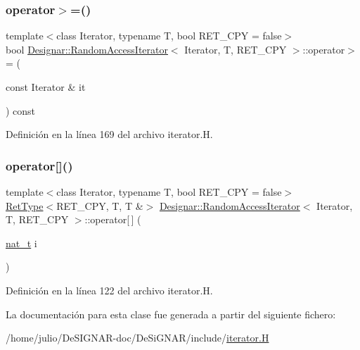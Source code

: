 \subsubsection{\texorpdfstring{operator$>$=()}{operator>=()}}
{\footnotesize\ttfamily template$<$class Iterator, typename T, bool R\+E\+T\+\_\+\+C\+PY = false$>$ \\
bool \hyperlink{class_designar_1_1_random_access_iterator}{Designar\+::\+Random\+Access\+Iterator}$<$ Iterator, T, R\+E\+T\+\_\+\+C\+PY $>$\+::operator$>$= (\begin{DoxyParamCaption}\item[{const Iterator \&}]{it }\end{DoxyParamCaption}) const\hspace{0.3cm}{\ttfamily [inline]}}



Definición en la línea 169 del archivo iterator.\+H.

\mbox{\label{class_designar_1_1_random_access_iterator_a19e24a37b546cb41aed275ff61fbc0b7}} 
\subsubsection{\texorpdfstring{operator[]()}{operator[]()}}
{\footnotesize\ttfamily template$<$class Iterator, typename T, bool R\+E\+T\+\_\+\+C\+PY = false$>$ \\
\hyperlink{namespace_designar_ab937f9c4bf5f1d0e65dbc616245d50ee}{Ret\+Type}$<$R\+E\+T\+\_\+\+C\+PY, T, T \&$>$ \hyperlink{class_designar_1_1_random_access_iterator}{Designar\+::\+Random\+Access\+Iterator}$<$ Iterator, T, R\+E\+T\+\_\+\+C\+PY $>$\+::operator\mbox{[}$\,$\mbox{]} (\begin{DoxyParamCaption}\item[{\hyperlink{namespace_designar_aa72662848b9f4815e7bf31a7cf3e33d1}{nat\+\_\+t}}]{i }\end{DoxyParamCaption})\hspace{0.3cm}{\ttfamily [inline]}}



Definición en la línea 122 del archivo iterator.\+H.



La documentación para esta clase fue generada a partir del siguiente fichero\+:\begin{DoxyCompactItemize}
\item 
/home/julio/\+De\+S\+I\+G\+N\+A\+R-\/doc/\+De\+Si\+G\+N\+A\+R/include/\hyperlink{iterator_8_h}{iterator.\+H}\end{DoxyCompactItemize}
